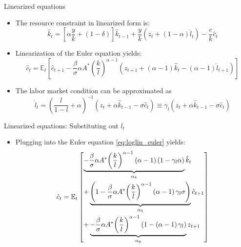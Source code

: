 \documentclass[handout,usepdftitle=false,xcolor=dvipsnames,aspectratio=169]{beamer}
\begin{document}
\begin{frame}{Linearized equations}
\begin{itemize}
\item The resource constraint in linearized form is:
\begin{equation}
   {{\hat k}_{t}} = \left[ {\alpha \frac{y}{k} + \left( {1 - \delta } \right)} \right]{{\hat k}_{t-1}} + \frac{y}{k}\left( {{z_t} + \left( {1 - \alpha } \right){{\hat l}_t}} \right) - \frac{c}{k}{{\hat c}_t}  \label{eq:loglin_resource}
\end{equation}
\item Linearization of the Euler equation yields:
\begin{equation}
{{\hat c}_t} = {\mathbb{E}_t}\left[ {{{\hat c}_{t + 1}} - \frac{\beta }{\sigma}\alpha A^{*}{{\left( {\frac{k}{l}} \right)}^{\alpha  - 1}}\left( {{z_{t + 1}} + \left( {\alpha  - 1} \right){{\hat k}_{t}} - \left( {\alpha  - 1} \right){{\hat l}_{t + 1}}} \right)} \right]
\label{eq:loglin_euler}
\end{equation}
\item The labor market condition can be approximated as
\begin{equation}
\hat l_t = {\left( {\frac{l}{{1 - l}} + \alpha } \right)^{ - 1}}\left( {{z_t} + \alpha {{\hat k}_{t-1}} - \sigma {{\hat c}_t}} \right) \equiv {\gamma_l}\left( {{z_t} + \alpha {{\hat k}_{t-1}} - \sigma {{\hat c}_t}} \right)
\label{eq:loglin_labor}
\end{equation}
\end{itemize}
\end{frame}

\begin{frame}{Linearized equations: Substituting out $l_t$}

\begin{itemize}
\item Plugging into the Euler equation \eqref{eq:loglin_euler} yields:
\begin{equation}
  {{\hat c}_t} = {\mathbb{E}_t}\left[ \begin{gathered}
  \underbrace { - \frac{\beta }{{\sigma }}\alpha A^{*}{{\left( {\frac{k}{l}} \right)}^{\alpha  - 1}}\left( {\alpha  - 1} \right)\left( {1 - {\gamma _l}\alpha } \right)}_{{\alpha _{4}}}{{\hat k}_{t}} \hfill \\
   + \underbrace {\left( {1 - \frac{\beta }{{\sigma }}\alpha A^{*}{{\left( {\frac{k}{l}} \right)}^{\alpha  - 1}}\left( {\alpha  - 1} \right){\gamma _l}\sigma } \right)}_{{\alpha _{5}}}{\hat c_{t + 1}} \hfill \\
   + \underbrace { - \frac{\beta }{{\sigma }}\alpha A^{*}{{\left( {\frac{k}{l}} \right)}^{\alpha  - 1}}\left( {1 - \left( {\alpha  - 1} \right){\gamma _l}} \right)}_{{\alpha _{6}}}{z_{t + 1}} \hfill \\
\end{gathered}  \right] \label{eq:euler_undet}
\end{equation}
\end{itemize}
\end{frame}
\end{document}
